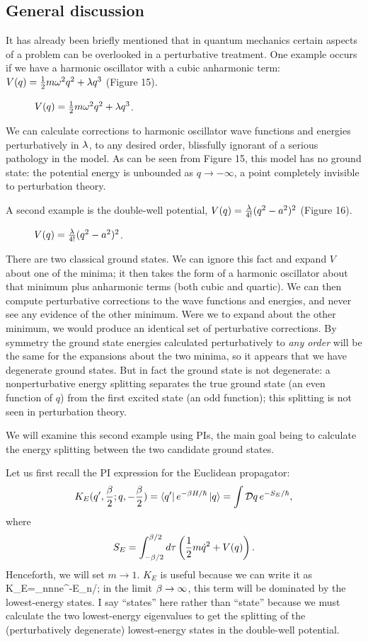 \documentclass[12pt]{article}
\begin{document}
\subsection{General discussion}
It has already been briefly mentioned that in quantum mechanics 
certain aspects of a problem can be overlooked in a perturbative
treatment. One example occurs if we have a harmonic oscillator with a
cubic anharmonic term: $V(q)={\frac 12} m{\omega}^2 q^2+\lambda q^3$ (Figure 15).

\begin{figure}[ht]
\epsfysize=5cm
\centerline{}
\caption{$V(q)={\frac 12} m{\omega}^2 q^2+\lambda q^3$.}
\end{figure}


We can calculate corrections to harmonic oscillator wave functions
and energies perturbatively in $\lambda$, to any desired
order, blissfully ignorant of a serious pathology in
the model.
As can be seen from Figure 15, this model has no ground state: the
potential energy is unbounded as $q\to-\infty$, a point completely
invisible to perturbation theory.

A second example is the double-well potential,
$V(q)={\lambda\over4!}(q^2-a^2)^2$ (Figure 16).
\begin{figure}[ht]
\epsfysize=4.5cm
\centerline{}
\caption{$V(q)={\lambda\over4!}(q^2-a^2)^2$.}
\end{figure}
There are two classical ground states. We can ignore this fact and
expand $V$ about one of the minima; it then takes the form of
a harmonic oscillator about that minimum plus anharmonic terms
(both cubic and quartic). We can then compute perturbative corrections
to the wave functions and energies, and never see any evidence of the
other minimum. Were we to expand about the other minimum, we would
produce an identical set of perturbative corrections. By symmetry the
ground state energies calculated perturbatively to {\em any order} will
be the same for the expansions about the two minima, so it appears
that we have degenerate ground states. But in fact the ground state is
not degenerate: a  nonperturbative energy splitting separates the true
ground state (an even function of $q$) from the first excited state
(an odd function); this splitting is not seen in perturbation theory.

We will examine this second example using PIs, the main goal being to
calculate the energy splitting between the two candidate ground states.

Let us first recall the PI expression for the Euclidean propagator:
\[
K_E(q',{\be\over2};q,-{\be\over2})=
\bra{q'}e^{-\be H/\hbar}\ket{q}=
\int\DD q\,e^{-S_E/\hbar},
\]
where 
\[
S_E=\int_{-{\beta}/2}^{{\beta}/2}d\tau\left({\frac 12} m{\dot q}^2+V(q)\right).
\]
Henceforth, we will set $m\to1$. $K_E$ is useful because we can write
it as
\beq
K_E=\sum_nn\rangle\langle ne^{-\be E_n/\hbar};
\label{inst1}
\eeq
in the limit ${\beta}\to\infty$, this term will be dominated by the
lowest-energy states. I say ``states'' here rather than ``state''
because we must calculate the two lowest-energy eigenvalues to get
the splitting of the (perturbatively degenerate) lowest-energy states
in the double-well potential.
\end{document}
